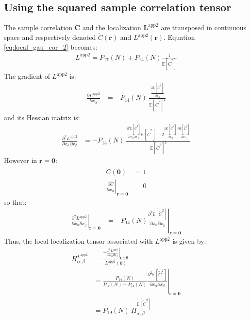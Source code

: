 \documentclass[12pt]{scrartcl}
\begin{document}
\subsection{Using the squared sample correlation tensor}
The sample correlation $\widetilde{\mathbf{C}}$ and the localization $\mathbf{L}^\mathrm{app2}$ are transposed in continuous space and respectively denoted $\widetilde{C}(\mathbf{r})$ and $L^\mathrm{app2}(\mathbf{r})$. Equation \eqref{eq:local_gau_cor_2} becomes:
\begin{align}
L^\mathrm{app2} = P_{17}(N) + P_{14}(N) \frac{1}{\mathbb{E} \left[\widetilde{C}^2\right]}
\end{align}
The gradient of $L^\mathrm{app2}$ is:
\begin{align}
\frac{\partial L^\mathrm{app2}}{\partial x_\alpha} & = - P_{14}(N) \ \frac{\displaystyle \frac{\partial \mathbb{E} \left[\widetilde{C}^2\right]}{\displaystyle \partial x_\alpha}}{\mathbb{E} \left[\widetilde{C}^2\right]^2}
\end{align}
and its Hessian matrix is:
\begin{align}
\frac{\partial^2 L^\mathrm{app2}}{\partial x_\alpha \partial x_\beta} & = - P_{14}(N) \ \frac{\displaystyle \frac{\partial^2 \mathbb{E} \left[\widetilde{C}^2\right]}{\displaystyle \partial x_\alpha \partial x_\beta} \mathbb{E} \left[\widetilde{C}^2\right] - 2 \frac{\partial \mathbb{E} \left[\widetilde{C}^2\right]}{\displaystyle \partial x_\alpha} \frac{\partial \mathbb{E} \left[\widetilde{C}^2\right]}{\displaystyle \partial x_\beta}}{\mathbb{E} \left[\widetilde{C}^2\right]^3}
\end{align}
However in $\mathbf{r} = \mathbf{0}$:
\begin{subequations}
\begin{align}
\widetilde{C}(\mathbf{0}) & = 1 \\
\left.\frac{\partial \widetilde{C}}{\partial x_\alpha}\right|_{\mathbf{r}=\mathbf{0}} & = 0
\end{align}
\end{subequations}
so that:
\begin{align}
\left.\frac{\partial^2 L^\mathrm{app2}}{\partial x_\alpha \partial x_\beta}\right|_{\mathbf{r}=\mathbf{0}} & = - P_{14}(N) \left.\frac{\partial^2 \mathbb{E} \left[\widetilde{C}^2\right]}{\displaystyle \partial x_\alpha \partial x_\beta} \right|_{\mathbf{r}=\mathbf{0}}
\end{align}
Thus, the local localization tensor associated with $L^\mathrm{app2}$ is given by:
\begin{align}
H^{L^\mathrm{app2}}_{\alpha,\beta} & = \frac{\displaystyle - \left.\frac{\partial^2 L^\mathrm{app2}}{\partial x_\alpha \partial x_\beta}\right|_{\mathbf{r}=\mathbf{0}}}{L^\mathrm{app2}(\mathbf{0})} \nonumber \\
& = \frac{P_{14}(N)}{P_{17}(N) + P_{14}(N)} \left.\frac{\partial^2 \mathbb{E} \left[\widetilde{C}^2\right]}{\displaystyle \partial x_\alpha \partial x_\beta} \right|_{\mathbf{r}=\mathbf{0}} \nonumber \\
& = P_{19}(N) \ H^{\mathbb{E} \left[\widetilde{C}^2\right]}_{\alpha,\beta}
\end{align}
\end{document}

